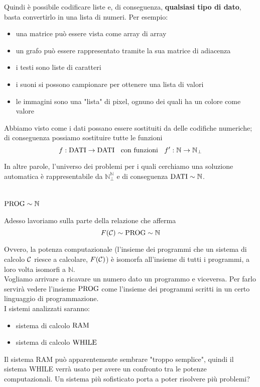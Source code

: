 Quindi è possibile codificare liste e, di conseguenza, \textbf{qualsiasi tipo di dato}, basta convertirlo in una lista di numeri. Per esempio:
\begin{itemize}
	\item una matrice può essere vista come array di array
	\item un grafo può essere rappresentato tramite la sua matrice di adiacenza
	\item i testi sono liste di caratteri
	\item i suoni si possono campionare per ottenere una lista di valori
	\item le immagini sono una "lista" di pixel, ognuno dei quali ha un colore come valore
\end{itemize}

Abbiamo visto come i dati possano essere sostituiti da delle codifiche numeriche; di conseguenza possiamo sostituire tutte le funzioni 
$$ f: \text{DATI} \rightarrow \text{DATI} \;\; \text{ con funzioni } \;\; f': \mathbb{N} \rightarrow \mathbb{N}_\bot $$

In altre parole, l'universo dei problemi per i quali cerchiamo una soluzione automatica è rappresentabile da $\mathbb{N}_\bot^{\mathbb{N}}$ e di conseguenza $\text{DATI} \sim \mathbb{N}$.\\

\section{$\text{PROG} \sim \mathbb{N}$}
Adesso lavoriamo sulla parte della relazione che afferma 
$$ F(\mathcal{C}) \sim \text{PROG} \sim \mathbb{N} $$

Ovvero, la potenza computazionale (l'insieme dei programmi che un sistema di calcolo $\mathcal{C}$ riesce a calcolare, $F(\mathcal{C})$) è isomorfa all'insieme di tutti i programmi, a loro volta isomorfi a $\mathbb{N}$.\\

Vogliamo arrivare a ricavare un numero dato un programmo e viceversa. Per farlo servirà vedere l'insieme $\text{PROG}$ come l'insieme dei programmi scritti in un certo linguaggio di programmazione.\\

I sistemi analizzati saranno: 
\begin{itemize}
	\item sistema di calcolo $\text{RAM}$
	\item sistema di calcolo $\text{WHILE}$
\end{itemize}

Il sistema RAM può apparentemente sembrare "troppo semplice", quindi il sistema WHILE verrà usato per avere un confronto tra le potenze computazionali. Un sistema più sofisticato porta a poter risolvere più problemi? \\

